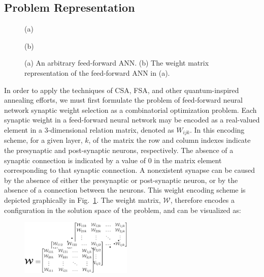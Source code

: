 \documentclass[10pt,journal,cspaper,compsoc]{IEEEtran}
\begin{document}
\subsection{Problem Representation}
\label{scn:weight_selection}

\begin{figure}[ht!]
	
	\begin{minipage}[b]{0.48\linewidth}
		\centering
		\centerline{}
		\centerline{(a)}\medskip
	\end{minipage}
	\hfill
	\begin{minipage}[b]{0.48\linewidth}
		\centering
		\centerline{}
		\centerline{(b)}\medskip
	\end{minipage}
	\caption{
		(a) An arbitrary feed-forward ANN.
		(b) The weight matrix representation of the feed-forward ANN in (a).}
	\label{fig:nettomatmapping}
\end{figure}

In order to apply the techniques of CSA, FSA, and other quantum-inspired annealing efforts, we must first formulate the problem of feed-forward neural network synaptic weight selection as a combinatorial optimization problem. Each synaptic weight in a feed-forward neural network may be encoded as a real-valued element in a 3-dimensional relation matrix, denoted as $\mathit{W}_{ijk}$. In this encoding scheme, for a given layer, $k$, of the matrix the row and column indexes indicate the presynaptic and post-synaptic neurons, respectively. The absence of a synaptic connection is indicated by a value of $0$ in the matrix element corresponding to that synaptic connection. A nonexistent synapse can be caused by the absence of either the presynaptic or post-synaptic neuron, or by the absence of a connection between the neurons. This weight encoding scheme is depicted graphically in Fig.~\ref{fig:nettomatmapping}. The weight matrix, $\boldsymbol{\mathcal{W}}$, therefore encodes a configuration in the solution space of the problem, and can be visualized as:

\begin{figure}[ht!]
	\begin{center}
		\includegraphics[width = 2.1in]{figures/abstract_matrix_rep.eps}
		\label{fig:abstract_matrix_rep}
	\end{center}
\end{figure}
\end{document}
